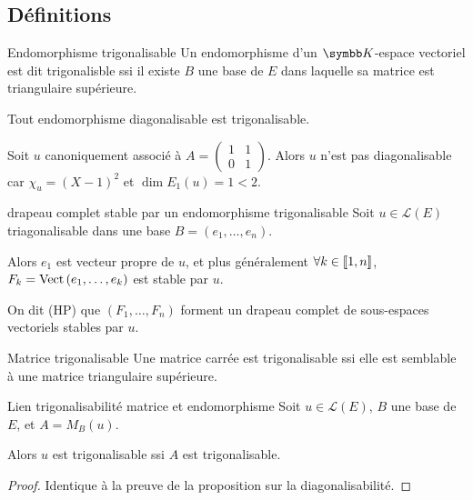 \subsection{Définitions}

\begin{definition}{Endomorphisme trigonalisable}{}
    Un endomorphisme d'un $\K$-espace vectoriel est dit trigonalisble ssi il existe 
    $B$ une base de $E$ dans laquelle sa matrice est triangulaire supérieure.
\end{definition}

\begin{exemple}
    Tout endomorphisme diagonalisable est trigonalisable.

    Soit $u$ canoniquement associé à $A = \begin{pmatrix}
        1 & 1 \\
        0 & 1
    \end{pmatrix}$. Alors $u$ n'est pas diagonalisable car
    $\chi_u = (X - 1)^2$ et $\dim E_1(u) = 1 < 2$.
\end{exemple}

\begin{propositionnt}{drapeau complet stable par un endomorphisme trigonalisable}{}
    Soit $u \in \mathscr L(E)$ triagonalisable dans une base $B = (e_1, \ldots, e_n)$.

    Alors $e_1$ est vecteur propre de $u$, et plus généralement 
    $\forall k \in [\![1, n]\!]$, $F_k = \operatorname{Vect} \,(e_1, \ldots, e_k)$ est stable par $u$.

    On dit (HP) que $(F_1, \dots, F_n)$ forment un drapeau complet de sous-espaces vectoriels stables par $u$.
\end{propositionnt}

\begin{definition}{Matrice trigonalisable}{}
    Une matrice carrée est trigonalisable ssi elle est semblable à une matrice triangulaire supérieure.
\end{definition}

\begin{proposition}{Lien trigonalisabilité matrice et endomorphisme}{}
    Soit $u \in \mathscr L(E)$, $B$ une base de $E$, et $A = M_B(u)$.

    Alors $u$ est trigonalisable ssi $A$ est trigonalisable.
\end{proposition}

\begin{proof}
    Identique à la preuve de la proposition sur la diagonalisabilité.
\end{proof}

